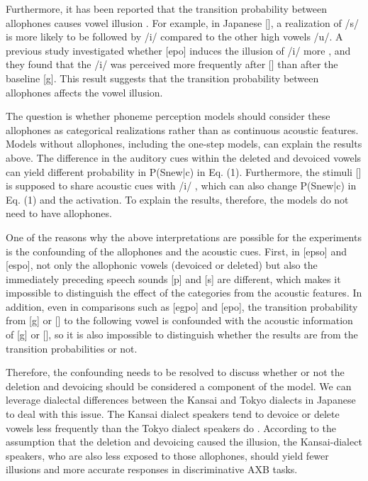 \documentclass[a4paper,11pt,twocolumn]{article}
\begin{document}
Furthermore, it has been reported that the transition probability between allophones causes vowel illusion \cite{kilpatrick2020japanese}. For example, in Japanese [\textctc], a realization of /s/ is more likely to be followed by /i/ compared to the other high vowels /u/. A previous study investigated whether [e\textctc{}po] induces the illusion of /i/ more \cite{kilpatrick2020japanese}, and they found that the /i/ was perceived more frequently after [\textctc] than after the baseline [g]. This result suggests that the transition probability between allophones affects the vowel illusion.

The question is whether phoneme perception models should consider these allophones as categorical realizations rather than as continuous acoustic features. Models without allophones, including the one-step models, can explain the results above. The difference in the auditory cues within the deleted and devoiced vowels can yield different probability in P(Snew|c) in Eq. (1). Furthermore, the stimuli [\textctc] is supposed to share acoustic cues with /i/ \cite{kubozono1999japanese_eng}, which can also change P(Snew|c) in Eq. (1) and the activation. To explain the results, therefore, the models do not need to have allophones.

One of the reasons why the above interpretations are possible for the experiments is the confounding of the allophones and the acoustic cues. First, in [ep\textsubring{\textturnm}so] and [espo], not only the allophonic vowels (devoiced or deleted) but also the immediately preceding speech sounds [p] and [s] are different, which makes it impossible to distinguish the effect of the categories from the acoustic features. In addition, even in comparisons such as [egpo] and [e\textctc{}po], the transition probability from [g] or [\textctc] to the following vowel is confounded with the acoustic information of [g] or [\textctc], so it is also impossible to distinguish whether the results are from the transition probabilities or not.

Therefore, the confounding needs to be resolved to discuss whether or not the deletion and devoicing should be considered a component of the model. We can leverage dialectal differences between the Kansai and Tokyo dialects in Japanese \cite{kishiyama2022onestep} to deal with this issue. The Kansai dialect speakers tend to devoice or delete vowels less frequently than the Tokyo dialect speakers do \cite{byun2011_eng, byun2012_eng}. According to the assumption that the deletion and devoicing caused the illusion, the Kansai-dialect speakers, who are also less exposed to those allophones, should yield fewer illusions and more accurate responses in discriminative AXB tasks.
\end{document}
